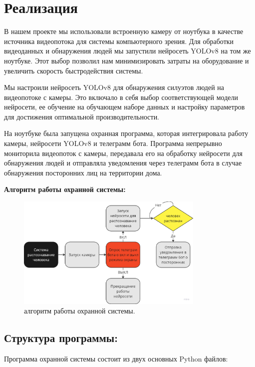 \section{Реализация}

В нашем проекте мы использовали встроенную камеру от ноутбука в качестве источника видеопотока для системы компьютерного зрения. Для обработки видеоданных и обнаружения людей мы запустили нейросеть YOLOv8 на том же ноутбуке. Этот выбор позволил нам минимизировать затраты на оборудование и увеличить скорость быстродействия системы.

Мы настроили нейросеть YOLOv8 для обнаружения силуэтов людей на видеопотоке с камеры. Это включало в себя выбор соответствующей модели нейросети, ее обучение на обучающем наборе данных и настройку параметров для достижения оптимальной производительности.

На ноутбуке была запущена охранная программа, которая интегрировала работу камеры, нейросети YOLOv8 и телеграмм бота. Программа непрерывно мониторила видеопоток с камеры, передавала его на обработку нейросети для обнаружения людей и отправляла уведомления через телеграмм бота в случае обнаружения посторонних лиц на территории дома.           

\textbf{Алгоритм работы охранной системы:}

\begin{figure}[h!]
	\centering
	\includegraphics[width=0.8\textwidth]{./graphics/img/image26.png}
	\caption{алгоритм работы охранной системы.}
	\label{fig:img26}
\end{figure}

\subsection{Структура программы:}

Программа охранной системы состоит из двух основных Python файлов:

